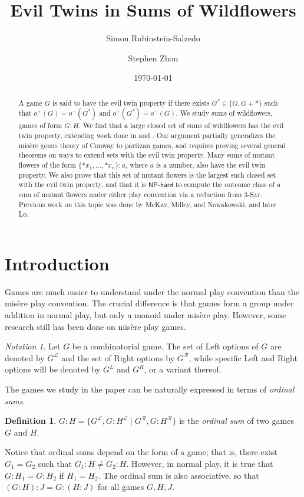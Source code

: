 \documentclass{amsart}
\title{Evil Twins in Sums of Wildflowers}
\author{Simon Rubinstein-Salzedo}
\author{Stephen Zhou}
\date{\today}
\theoremstyle{plain}
\theoremstyle{definition}
\newtheorem{defn}[thm]{Definition}
\theoremstyle{remark}
\newtheorem*{notn}{Notation}
\numberwithin{equation}{section}
\numberwithin{thm}{section}
\begin{document}
\maketitle
\begin{abstract}
     A game $G$ is said to have the evil twin property if there exists $G^* \in \{G,G+*\}$ such that $o^+(G) = o^-(G^*)$ and $o^+(G^*) = o^-(G)$. We study sums of wildflowers, games of form $G:H$. We find that a large closed set of sums of wildflowers has the evil twin property, extending work done in \cite{mckay2016misere} and \cite{lomisere}. Our argument partially generalizes the mis\`ere genus theory of Conway to partizan games, and requires proving several general theorems on ways to extend sets with the evil twin property. Many sums of mutant flowers of the form $\{*x_1,\dots,*x_n\}:a$, where $a$ is a number, also have the evil twin property. We also prove that this set of mutant flowers is the largest such closed set with the evil twin property, and that it is $\mathsf{NP\text{-}hard}$ to compute the outcome class of a sum of mutant flowers under either play convention via a reduction from \textsc{3-Sat}. Previous work on this topic was done by McKay, Milley, and Nowakowski, and later Lo. 
\end{abstract}
\section{Introduction}
\label{2}

Games are much easier to understand under the normal play convention than the mis\`ere play convention. The crucial difference is that games form a group under addition in normal play, but only a monoid under mis\`ere play. However, some research still has been done on mis\`ere play games.

\begin{notn}
    Let $G$ be a combinatorial game. The set of Left options of $G$ are denoted by $G^{\mathcal{L}}$ and the set of Right options by $G^{\mathcal{R}}$, while specific Left and Right options will be denoted by $G^L$ and $G^R$, or a variant thereof.
\end{notn}

The games we study in the paper can be naturally expressed in terms of \emph{ordinal sums}.

\begin{defn}
    $G:H = \{G^\mathcal{L},G:H^\mathcal{L}\mid G^\mathcal{R},G:H^\mathcal{R}\}$ is the \emph{ordinal sum} of two games $G$ and $H$. 
\end{defn}
Notice that ordinal sums depend on the form of a game; that is, there exist $G_1 = G_2$ such that $G_1:H \neq G_2:H$. However, in normal play, it is true that $G:H_1 = G:H_2$ if $H_1 = H_2$. The ordinal sum is also associative, so that $(G:H):J = G:(H:J)$ for all games $G,H,J$.
\end{document}
